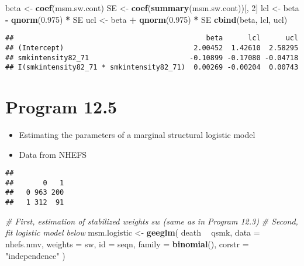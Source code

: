 \documentclass[10pt,]{book}
\newenvironment{Shaded}{\begin{snugshade}}{\end{snugshade}}
\newcommand{\CommentTok}[1]{\textcolor[rgb]{0.56,0.35,0.01}{\textit{#1}}}
\newcommand{\DataTypeTok}[1]{\textcolor[rgb]{0.13,0.29,0.53}{#1}}
\newcommand{\DecValTok}[1]{\textcolor[rgb]{0.00,0.00,0.81}{#1}}
\newcommand{\FloatTok}[1]{\textcolor[rgb]{0.00,0.00,0.81}{#1}}
\newcommand{\KeywordTok}[1]{\textcolor[rgb]{0.13,0.29,0.53}{\textbf{#1}}}
\newcommand{\NormalTok}[1]{#1}
\newcommand{\OperatorTok}[1]{\textcolor[rgb]{0.81,0.36,0.00}{\textbf{#1}}}
\newcommand{\StringTok}[1]{\textcolor[rgb]{0.31,0.60,0.02}{#1}}
\providecommand{\tightlist}{%
  \setlength{\itemsep}{0pt}\setlength{\parskip}{0pt}}
\begin{document}
\begin{Shaded}
\begin{Highlighting}[]
\NormalTok{beta <-}\StringTok{ }\KeywordTok{coef}\NormalTok{(msm.sw.cont)}
\NormalTok{SE <-}\StringTok{ }\KeywordTok{coef}\NormalTok{(}\KeywordTok{summary}\NormalTok{(msm.sw.cont))[, }\DecValTok{2}\NormalTok{]}
\NormalTok{lcl <-}\StringTok{ }\NormalTok{beta }\OperatorTok{-}\StringTok{ }\KeywordTok{qnorm}\NormalTok{(}\FloatTok{0.975}\NormalTok{) }\OperatorTok{*}\StringTok{ }\NormalTok{SE}
\NormalTok{ucl <-}\StringTok{ }\NormalTok{beta }\OperatorTok{+}\StringTok{ }\KeywordTok{qnorm}\NormalTok{(}\FloatTok{0.975}\NormalTok{) }\OperatorTok{*}\StringTok{ }\NormalTok{SE}
\KeywordTok{cbind}\NormalTok{(beta, lcl, ucl)}
\end{Highlighting}
\end{Shaded}

\begin{verbatim}
##                                              beta      lcl      ucl
## (Intercept)                               2.00452  1.42610  2.58295
## smkintensity82_71                        -0.10899 -0.17080 -0.04718
## I(smkintensity82_71 * smkintensity82_71)  0.00269 -0.00204  0.00743
\end{verbatim}

\hypertarget{program-12.5}{%
\section{Program 12.5}\label{program-12.5}}

\begin{itemize}
\tightlist
\item
  Estimating the parameters of a marginal structural logistic model
\item
  Data from NHEFS
\end{itemize}

\begin{Shaded}
\end{Shaded}

\begin{verbatim}
##    
##       0   1
##   0 963 200
##   1 312  91
\end{verbatim}

\begin{Shaded}
\begin{Highlighting}[]
\CommentTok{# First, estimation of stabilized weights sw (same as in Program 12.3)}
\CommentTok{# Second, fit logistic model below}
\NormalTok{msm.logistic <-}\StringTok{ }\KeywordTok{geeglm}\NormalTok{(}
\NormalTok{  death }\OperatorTok{~}\StringTok{ }\NormalTok{qsmk,}
  \DataTypeTok{data =}\NormalTok{ nhefs.nmv,}
  \DataTypeTok{weights =}\NormalTok{ sw,}
  \DataTypeTok{id =}\NormalTok{ seqn,}
  \DataTypeTok{family =} \KeywordTok{binomial}\NormalTok{(),}
  \DataTypeTok{corstr =} \StringTok{"independence"}
\NormalTok{)}
\end{Highlighting}
\end{Shaded}
\end{document}
